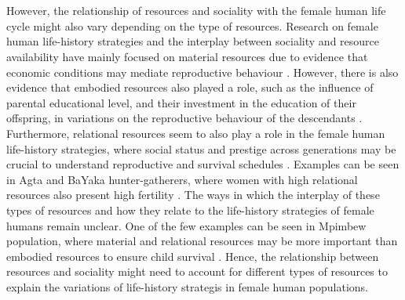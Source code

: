 \documentclass{article}
\begin{document}
\\\\
However, the relationship of resources and sociality with the female human life cycle might also vary depending on the type of resources. Research on female human life-history strategies and the interplay between sociality and resource availability have mainly focused on material resources due to evidence that economic conditions may mediate reproductive behaviour \citep{shenk2013model}. However, there is also evidence that embodied resources also played a role, such as the influence of parental educational level, and their investment in the education of their offspring, in variations on the reproductive behaviour of the descendants \citep{kaplan1996theory,snopkowski2014synthetic,snopkowski2016pathways}. Furthermore, relational resources seem to also play a role in the female human life-history strategies, where social status and prestige across generations may be crucial to understand reproductive and survival schedules \citep{boone1999more,shenk2016status}. Examples can be seen in Agta and BaYaka hunter-gatherers, where women with high relational resources also present high fertility \citep{chaudhary2016competition,page2017hunter}. The ways in which the interplay of these types of resources and how they relate to the life-history strategies of female humans remain unclear. One of the few examples can be seen in Mpimbew population, where material and relational resources may be more important than embodied resources to ensure child survival \citep{mulder2011understanding}. Hence, the relationship between resources and sociality might need to account for different types of resources to explain the variations of life-history strategis in female human populations.
\\\\
\end{document}
